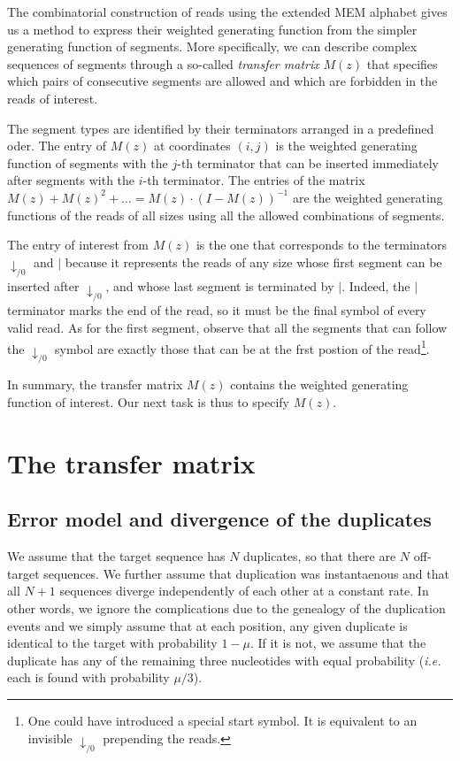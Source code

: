 \documentclass{article}
\begin{document}
The combinatorial construction of reads using the extended MEM alphabet
gives us a method to express their weighted generating function from the
simpler generating function of segments. More specifically, we can
describe complex sequences of segments through a so-called \emph{transfer
matrix} $M(z)$ that specifies which pairs of consecutive segments are
allowed and which are forbidden in the reads of interest.

The segment types are identified by their terminators arranged in a
predefined oder. The entry of $M(z)$ at coordinates $(i,j)$ is the
weighted generating function of segments with the $j$-th terminator that
can be inserted immediately after segments with the $i$-th terminator. The
entries of the matrix $M(z) + M(z)^2 + \ldots = M(z) \cdot (I-M(z))^{-1}$
are the weighted generating functions of the reads of all sizes using all
the allowed combinations of segments.

The entry of interest from $M(z)$ is the one that corresponds to the
terminators $\downarrow_{/0}$ and $|$ because it represents the reads of
any size whose first segment can be inserted after $\downarrow_{/0}$, and
whose last segment is terminated by $|$. Indeed, the $|$ terminator marks
the end of the read, so it must be the final symbol of every valid read.
As for the first segment, observe that all the segments that can follow
the $\downarrow_{/0}$ symbol are exactly those that can be at the frst
postion of the read\footnote{One could have introduced a special start
symbol. It is equivalent to an invisible $\downarrow_{/0}$ prepending
the reads.}.

In summary, the transfer matrix $M(z)$ contains the weighted generating
function of interest. Our next task is thus to specify $M(z)$.



\section{The transfer matrix}
\label{sec:transfer_mat}


\subsection{Error model and divergence of the duplicates}

We assume that the target sequence has $N$ duplicates, so that there are
$N$ off-target sequences. We further assume that duplication was
instantaenous and that all $N+1$ sequences diverge independently of each
other at a constant rate. In other words, we ignore the complications due
to the genealogy of the duplication events and we simply assume that at
each position, any given duplicate is identical to the target with
probability $1-\mu$. If it is not, we assume that the duplicate has any of
the remaining three nucleotides with equal probability (\textit{i.e.} each
is found with probability $\mu/3$).
\end{document}
